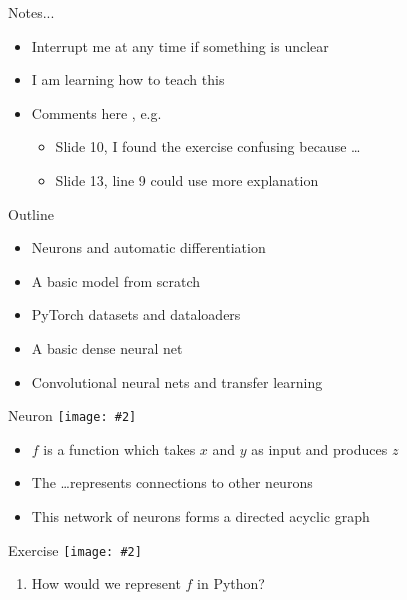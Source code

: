 \documentclass[hyperref={pdfpagelabels=false},12pt]{beamer}
\newcommand{\ig}[2]{\texttt{[image: \#2]}}
\newcommand{\unnamedUrl}[1]{\href{#1}{\color{blue}{#1}}}
\begin{document}
\begin{frame}[plain]
\titlepage
\end{frame}

\begin{frame}{Notes...}
  \begin{itemize}
    \item Interrupt me at any time if something is unclear
    \item I am learning how to teach this
    \item Comments here \unnamedUrl{https://forms.gle/EzNzAxFkLBXgohCL6}, e.g.
    \begin{itemize}
      \item Slide 10, I found the exercise confusing because \dots
      \item Slide 13, line 9 could use more explanation
    \end{itemize}
  \end{itemize}
\end{frame}

\begin{frame}{Outline}
  \begin{itemize}
    \item Neurons and automatic differentiation
    \item A basic model from scratch
    \item PyTorch datasets and dataloaders
    \item A basic dense neural net
    \item Convolutional neural nets and transfer learning
  \end{itemize}
\end{frame}

\begin{frame}{Neuron}
  \centering
  \ig{0.75}{figures/neuron.png}
  \begin{itemize}
      \item $f$ is a function which takes $x$ and $y$ as input and produces $z$
      \item The \dots represents connections to other neurons
      \item This network of neurons forms a directed acyclic graph
  \end{itemize}
\end{frame}

\begin{frame}{Exercise}
  \centering
  \ig{0.75}{figures/neuron.png}
  \begin{enumerate}
    \item How would we represent $f$ in Python?
  \end{enumerate}
\end{frame}
\end{document}
